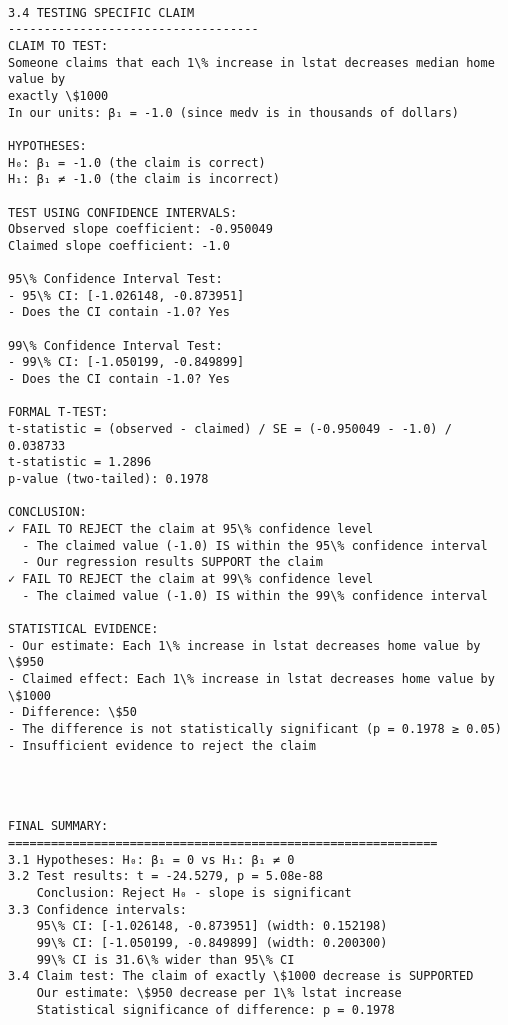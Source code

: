 \documentclass[11pt, twocolumn]{article}
\begin{document}
    \begin{Verbatim}[commandchars=\\\{\}]

3.4 TESTING SPECIFIC CLAIM
-----------------------------------
CLAIM TO TEST:
Someone claims that each 1\% increase in lstat decreases median home value by
exactly \$1000
In our units: β₁ = -1.0 (since medv is in thousands of dollars)

HYPOTHESES:
H₀: β₁ = -1.0 (the claim is correct)
H₁: β₁ ≠ -1.0 (the claim is incorrect)

TEST USING CONFIDENCE INTERVALS:
Observed slope coefficient: -0.950049
Claimed slope coefficient: -1.0

95\% Confidence Interval Test:
- 95\% CI: [-1.026148, -0.873951]
- Does the CI contain -1.0? Yes

99\% Confidence Interval Test:
- 99\% CI: [-1.050199, -0.849899]
- Does the CI contain -1.0? Yes

FORMAL T-TEST:
t-statistic = (observed - claimed) / SE = (-0.950049 - -1.0) / 0.038733
t-statistic = 1.2896
p-value (two-tailed): 0.1978

CONCLUSION:
✓ FAIL TO REJECT the claim at 95\% confidence level
  - The claimed value (-1.0) IS within the 95\% confidence interval
  - Our regression results SUPPORT the claim
✓ FAIL TO REJECT the claim at 99\% confidence level
  - The claimed value (-1.0) IS within the 99\% confidence interval

STATISTICAL EVIDENCE:
- Our estimate: Each 1\% increase in lstat decreases home value by \$950
- Claimed effect: Each 1\% increase in lstat decreases home value by \$1000
- Difference: \$50
- The difference is not statistically significant (p = 0.1978 ≥ 0.05)
- Insufficient evidence to reject the claim
    \end{Verbatim}

    \begin{center}
    \end{center}
    { \hspace*{\fill} \\}
    
    \begin{Verbatim}[commandchars=\\\{\}]

FINAL SUMMARY:
============================================================
3.1 Hypotheses: H₀: β₁ = 0 vs H₁: β₁ ≠ 0
3.2 Test results: t = -24.5279, p = 5.08e-88
    Conclusion: Reject H₀ - slope is significant
3.3 Confidence intervals:
    95\% CI: [-1.026148, -0.873951] (width: 0.152198)
    99\% CI: [-1.050199, -0.849899] (width: 0.200300)
    99\% CI is 31.6\% wider than 95\% CI
3.4 Claim test: The claim of exactly \$1000 decrease is SUPPORTED
    Our estimate: \$950 decrease per 1\% lstat increase
    Statistical significance of difference: p = 0.1978
    \end{Verbatim}
\end{document}
